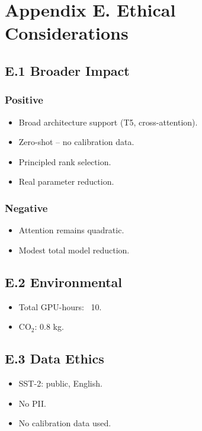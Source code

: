 \section{Appendix E. Ethical Considerations}

\subsection{E.1 Broader Impact}

\subsubsection{Positive}
\begin{itemize}
\item Broad architecture support (T5, cross-attention).
\item Zero-shot -- no calibration data.
\item Principled rank selection.
\item Real parameter reduction.

\end{itemize}
\subsubsection{Negative}
\begin{itemize}
\item Attention remains quadratic.
\item Modest total model reduction.

\end{itemize}
\subsection{E.2 Environmental}

\begin{itemize}
\item Total GPU-hours: ~10.
\item CO$_2$: 0.8 kg.

\end{itemize}
\subsection{E.3 Data Ethics}

\begin{itemize}
\item SST-2: public, English.
\item No PII.
\item No calibration data used.

\end{itemize}
